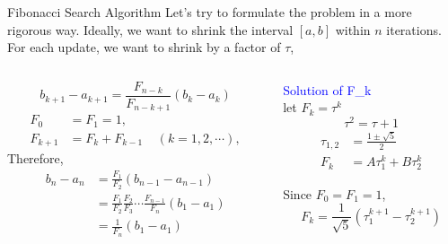 \documentclass{beamer}
\begin{document}
\begin{frame}{Fibonacci Search Algorithm}
Let's try to formulate the problem in a more rigorous way. 
Ideally, we want to shrink the interval $[a, b]$ within $n$ iterations. For each update, we want to shrink by a factor of $\tau$,
\begin{columns}

\begin{column}{0.6 \textwidth}
\begin{equation*}
   b_{k+1} - a_{k+1} = \frac{F_{n-k}}{F_{n-k+1}}(b_k - a_k) %
\end{equation*}
\begin{equation*}
\begin{split}
    F_0 &= F_1 = 1,\\
    F_{k+1} &= F_k + F_{k-1}~~~~~(k=1, 2, \cdots),     
\end{split}
\end{equation*}
Therefore,
\begin{equation*}
\begin{split}
    b_n - a_n &= \frac{F_1}{F_2}(b_{n-1}- a_{n-1})\\
              &= \frac{F_1}{F_2}\frac{F_2}{F_3} \cdots \frac{F_{n-1}}{F_n} (b_1-a_1)\\
              &= \frac{1}{F_n}(b_1 - a_1)
\end{split}
\end{equation*}
\end{column}

\begin{column}{0.4 \textwidth}
\centering
\textcolor{blue}{Solution of F_k}\\
let $F_k = \tau^k$
\begin{equation*}
    \tau^2 = \tau + 1
\end{equation*}
\begin{equation*}
\begin{split}
    \tau_{1,2} &= \frac{1\pm \sqrt{5}}{2}\\
    F_k & = A\tau_1^k + B\tau_2^k
\end{split}
\end{equation*}

Since $F_0 = F_1 = 1$, 
\begin{equation*}
    F_k = \frac{1}{\sqrt{5}} (\tau_1^{k+1} - \tau_2^{k+1})
\end{equation*}
\end{column}

\end{columns}

\end{frame}
\end{document}

